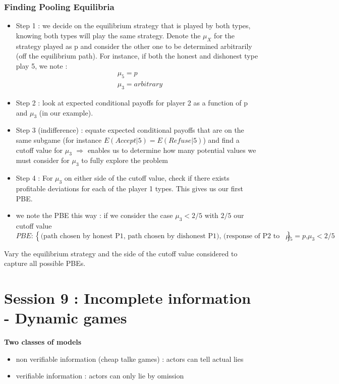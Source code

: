 \documentclass{article}
\begin{document}
\subsubsection{Finding Pooling Equilibria}
\begin{itemize}
    \item Step 1 : we decide on the equilibrium strategy that is played by both types, knowing both types will play the same strategy. Denote the $\mu_X$ for the strategy played as p and consider the other one to be determined arbitrarily (off the equilibrium path). For instance, if both the honest and dishonest type play 5, we note : 
    \begin{equation}
    \begin{aligned}
        &\mu_5 = p\\
        &\mu_3= arbitrary
    \end{aligned}
    \end{equation}
    \item Step 2 : look at expected conditional payoffs for player 2 as a function of p and $\mu_3$ (in our example). 
    \item Step 3 (indifference) : equate expected conditional payoffs that are on the same subgame (for instance $E(Accept|5) = E(Refuse|5)$) and find a cutoff value for $\mu_3$ $\Rightarrow$ enables us to determine how many potential values we must consider for $\mu_3$ to fully explore the problem
    \item Step 4 : For $\mu_3$ on either side of the cutoff value, check if there exists profitable deviations for each of the player 1 types. This gives us our first PBE.
    \item we note the PBE this way : if we consider the case $\mu_3<2/5$ with $2/5$ our cutoff value
    \begin{equation}
        PBE : \left\{(\text{path chosen by honest P1, path chosen by dishonest P1), (response of P2 to 5, response of P2 to 3), $\mu_5=p$,$\mu_3<2/5$}    \right\}
    \end{equation}
\end{itemize}
Vary the equilibrium strategy and the side of the cutoff value considered to capture all possible PBEs. 

\section{Session 9 : Incomplete information - Dynamic games }

\noindent \textbf{Two classes of models}
\begin{itemize}
    \item non verifiable information (cheap talke games) : actors can tell actual lies
    \item verifiable information : actors can only lie by omission
\end{itemize}
\end{document}
